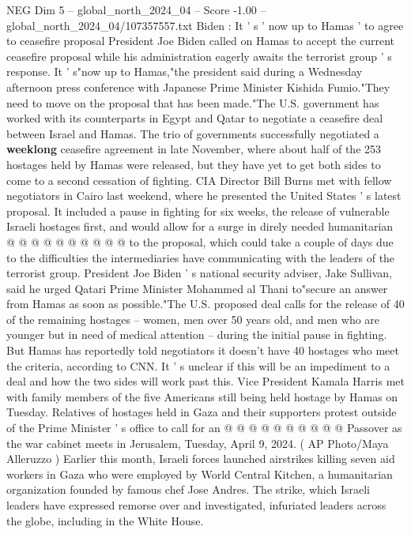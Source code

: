 \begin{textsample}{NEG Dim 5 – global\_north\_2024\_04 – Score -1.00 – global\_north\_2024\_04/107357557.txt}  \label{ex:f5_neg_162}
Biden : It ' s ' now up to Hamas ' to agree to ceasefire proposal President Joe Biden called on Hamas to accept the current ceasefire proposal while his administration eagerly awaits the terrorist group ' s response.
It ' s"now up to Hamas,"the president said during a Wednesday afternoon press conference with Japanese Prime Minister Kishida Fumio."They need to move on the proposal that has been made."The U.S. government has worked with its counterparts in Egypt and Qatar to negotiate a ceasefire deal between Israel and Hamas.
The trio of governments successfully negotiated a \textbf{weeklong} ceasefire agreement in late November, where about half of the 253 hostages held by Hamas were released, but they have yet to get both sides to come to a second cessation of fighting.
CIA Director Bill Burns met with fellow negotiators in Cairo last weekend, where he presented the United States ' s latest proposal.
It included a pause in fighting for six weeks, the release of vulnerable Israeli hostages first, and would allow for a surge in direly needed humanitarian @ @ @ @ @ @ @ @ @ @ to the proposal, which could take a couple of days due to the difficulties the intermediaries have communicating with the leaders of the terrorist group.
President Joe Biden ' s national security adviser, Jake Sullivan, said he urged Qatari Prime Minister Mohammed al Thani to"secure an answer from Hamas as soon as possible."The U.S. proposed deal calls for the release of 40 of the remaining hostages -- women, men over 50 years old, and men who are younger but in need of medical attention -- during the initial pause in fighting.
But Hamas has reportedly told negotiators it doesn't have 40 hostages who meet the criteria, according to CNN.
It ' s unclear if this will be an impediment to a deal and how the two sides will work past this.
Vice President Kamala Harris met with family members of the five Americans still being held hostage by Hamas on Tuesday.
Relatives of hostages held in Gaza and their supporters protest outside of the Prime Minister ' s office to call for an @ @ @ @ @ @ @ @ @ @ Passover as the war cabinet meets in Jerusalem, Tuesday, April 9, 2024. ( AP Photo/Maya Alleruzzo ) Earlier this month, Israeli forces launched airstrikes killing seven aid workers in Gaza who were employed by World Central Kitchen, a humanitarian organization founded by famous chef Jose Andres.
The strike, which Israeli leaders have expressed remorse over and investigated, infuriated leaders across the globe, including in the White House.

\end{textsample}
